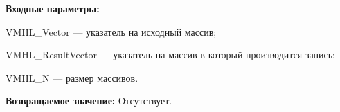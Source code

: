 \textbf{Входные параметры:}

 VMHL\_Vector --- указатель на исходный массив;
 
 VMHL\_ResultVector --- указатель на массив в который производится запись;
 
 VMHL\_N --- размер массивов.

\textbf{Возвращаемое значение:}
Отсутствует.